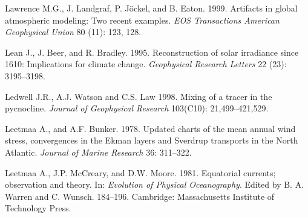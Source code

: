 \begin{thebibliography}{999}
Lawrence M.G., J. Landgraf, P. J\"{o}ckel, and
B. Eaton. 1999. Artifacts in global atmospheric modeling: Two recent
examples. \textit{EOS Transactions American Geophysical Union} 80
(11): 123, 128.
%

Lean J., J. Beer, and R. Bradley.  1995. Reconstruction of solar
irradiance since 1610: Implications for climate
change. \textit{Geophysical Research Letters} 22 (23): 3195--3198.
%

Ledwell J.R., A.J. Watson and C.S. Law 1998. Mixing of a tracer in the
pycnocline. \textit{Journal of Geophysical Research} 103(C10):
21,499--421,529.
%

Leetmaa A., and A.F. Bunker.  1978. Updated charts of the mean annual
wind stress, convergences in the Ekman layers and Sverdrup transports
in the North Atlantic. \textit{Journal of Marine Research} 36:
311--322.
%

Leetmaa A., J.P. McCreary, and D.W. Moore.  1981. Equatorial currents;
observation and theory. In: \textit{Evolution of Physical
  Oceanography}. Edited by B. A. Warren and
C. Wunsch. 184--196. Cambridge: Massachusetts Institute of Technology
Press.
%


\end{thebibliography}
